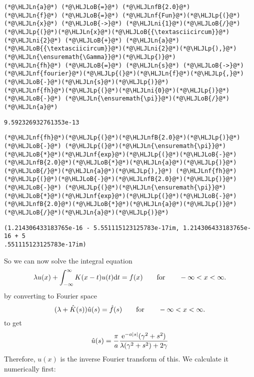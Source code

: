 \documentclass[12pt,landscape]{article}
\newcommand{\HLJLn}[1]{#1}
\newcommand{\HLJLnf}[1]{\textcolor[RGB]{66,102,213}{#1}}
\newcommand{\HLJLnfB}[1]{\textcolor[RGB]{59,151,46}{#1}}
\newcommand{\HLJLni}[1]{\textcolor[RGB]{59,151,46}{#1}}
\newcommand{\HLJLoB}[1]{\textcolor[RGB]{102,102,102}{\textbf{#1}}}
\newcommand{\HLJLp}[1]{#1}
\def\qqfor{\qquad\hbox{for}\qquad}
\def\D{ {\rm d} }
\def\E{ {\rm e} }
\def\dt{\D t}
\begin{document}
{\begin{lstlisting}
(*@\HLJLn{a}@*) (*@\HLJLoB{=}@*) (*@\HLJLnfB{2.0}@*)
(*@\HLJLn{f}@*) (*@\HLJLoB{=}@*) (*@\HLJLnf{Fun}@*)(*@\HLJLp{(}@*)(*@\HLJLn{x}@*) (*@\HLJLoB{->}@*) (*@\HLJLni{1}@*)(*@\HLJLoB{/}@*)(*@\HLJLp{(}@*)(*@\HLJLn{x}@*)(*@\HLJLoB{{\textasciicircum}}@*)(*@\HLJLni{2}@*) (*@\HLJLoB{+}@*) (*@\HLJLn{a}@*)(*@\HLJLoB{{\textasciicircum}}@*)(*@\HLJLni{2}@*)(*@\HLJLp{),}@*) (*@\HLJLn{\ensuremath{\Gamma}}@*)(*@\HLJLp{)}@*)
(*@\HLJLn{fh}@*) (*@\HLJLoB{=}@*) (*@\HLJLn{s}@*) (*@\HLJLoB{->}@*) (*@\HLJLnf{fourier}@*)(*@\HLJLp{(}@*)(*@\HLJLn{f}@*)(*@\HLJLp{,}@*) (*@\HLJLoB{-}@*)(*@\HLJLn{s}@*)(*@\HLJLp{)}@*)
(*@\HLJLnf{fh}@*)(*@\HLJLp{(}@*)(*@\HLJLni{0}@*)(*@\HLJLp{)}@*) (*@\HLJLoB{-}@*) (*@\HLJLn{\ensuremath{\pi}}@*)(*@\HLJLoB{/}@*)(*@\HLJLn{a}@*)
\end{lstlisting}
\begin{lstlisting}
9.592326932761353e-13
\end{lstlisting}
\begin{lstlisting}
(*@\HLJLnf{fh}@*)(*@\HLJLp{(}@*)(*@\HLJLnfB{2.0}@*)(*@\HLJLp{)}@*) (*@\HLJLoB{-}@*) (*@\HLJLp{(}@*)(*@\HLJLn{\ensuremath{\pi}}@*)(*@\HLJLoB{*}@*)(*@\HLJLnf{exp}@*)(*@\HLJLp{(}@*)(*@\HLJLoB{-}@*)(*@\HLJLnfB{2.0}@*)(*@\HLJLoB{*}@*)(*@\HLJLn{a}@*)(*@\HLJLp{)}@*)(*@\HLJLoB{/}@*)(*@\HLJLn{a}@*)(*@\HLJLp{),}@*) (*@\HLJLnf{fh}@*)(*@\HLJLp{(}@*)(*@\HLJLoB{-}@*)(*@\HLJLnfB{2.0}@*)(*@\HLJLp{)}@*) (*@\HLJLoB{-}@*) (*@\HLJLp{(}@*)(*@\HLJLn{\ensuremath{\pi}}@*)(*@\HLJLoB{*}@*)(*@\HLJLnf{exp}@*)(*@\HLJLp{(}@*)(*@\HLJLoB{-}@*)(*@\HLJLnfB{2.0}@*)(*@\HLJLoB{*}@*)(*@\HLJLn{a}@*)(*@\HLJLp{)}@*)(*@\HLJLoB{/}@*)(*@\HLJLn{a}@*)(*@\HLJLp{)}@*)
\end{lstlisting}
\begin{lstlisting}
(1.214306433183765e-16 - 5.551115123125783e-17im, 1.214306433183765e-16 + 5
.551115123125783e-17im)
\end{lstlisting}
So we can now solve the integral equation
\[
\lambda u(x) + \int_{-\infty}^\infty K(x-t)u(t) \dt = f(x)\qqfor -\infty < x < \infty.
\]
by converting to Fourier space
\[
(\lambda + \hat K(s)) \hat u(s)  = \hat f(s)\qqfor -\infty < x < \infty.
\]
to get
\[
\hat u(s) = {\pi \over a} { \E^{-a |s|} (\gamma^2+s^2) \over \lambda (\gamma^2+s^2) + 2\gamma}
\]
Therefore, $u(x)$ is the inverse Fourier transform of this. We calculate it numerically first:


}
\end{document}
